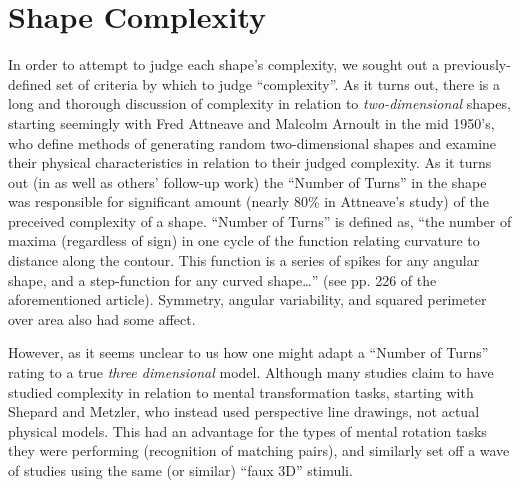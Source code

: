 \section{Shape Complexity}

In order to attempt to judge each shape's complexity, we sought out a
previously-defined set of criteria by which to judge ``complexity''. As it turns
out, there is a long and thorough discussion of complexity in relation to
\emph{two-dimensional} shapes, starting seemingly with Fred Attneave and Malcolm
Arnoult\cite{attneave1956quantitative}\cite{attneave1957physical} in the mid
1950's, who define methods of generating random two-dimensional shapes and
examine their physical characteristics in relation to their judged complexity.
As it turns out (in \cite{attneave1957physical} as well as others' follow-up
work) the ``Number of Turns'' in the shape was responsible for significant
amount (nearly 80\% in Attneave's study) of the preceived complexity of a shape.
``Number of Turns'' is defined as, ``the number of maxima (regardless of sign)
in one cycle of the function relating curvature to distance along the contour.
This function is a series of spikes for any angular shape, and a step-function
for any curved shape\ldots'' (see pp. 226 of the aforementioned article).
Symmetry, angular variability, and squared perimeter over area also had some
affect.

However, as it seems unclear to us how one might adapt a ``Number of Turns''
rating to a true \emph{three dimensional} model. Although many studies claim to
have studied complexity in relation to mental transformation tasks, starting
with Shepard and Metzler\cite{shepard1971mental}, who instead used perspective
line drawings, not actual physical models. This had an advantage for the types
of mental rotation tasks they were performing (recognition of matching pairs),
and similarly set off a wave of studies using the same (or similar) ``faux 3D''
stimuli\cite{metzler1974transformational}\cite{shepard1988mental}\cite{vandenberg1978mental}.


